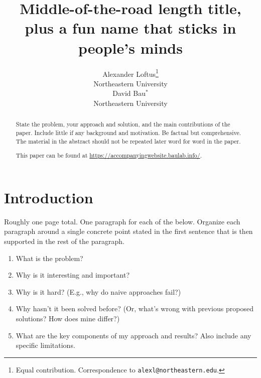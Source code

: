 \documentclass{article}
\title{Middle-of-the-road length title, plus a fun name that sticks in people's minds}
\author{%
Alexander Loftus\thanks{Equal contribution. Correspondence to \texttt{alexl@northeastern.edu}.} \\
Northeastern University \\
\And
David Bau$^*$ \\
Northeastern University \\
}
\begin{document}

\maketitle


\begin{abstract}
\label{abstract}

State the problem, your approach and solution, and the main contributions of the paper. Include little if any background and motivation. Be factual but comprehensive. The material in the abstract should not be repeated later word for word in the paper.

This paper can be found at \url{https://accompanyingwebsite.baulab.info/}.

\end{abstract}



\section{Introduction}
\label{introduction}


Roughly one page total. One paragraph for each of the below. Organize each paragraph around a single concrete point stated in the first sentence that is then supported in the rest of the paragraph.

\begin{enumerate}
\item What is the problem?
\item Why is it interesting and important?
\item Why is it hard? (E.g., why do naive approaches fail?)
\item Why hasn't it been solved before? (Or, what's wrong with previous proposed solutions? How does mine differ?)
\item What are the key components of my approach and results? Also include any specific limitations.
\end{enumerate}
\end{document}
